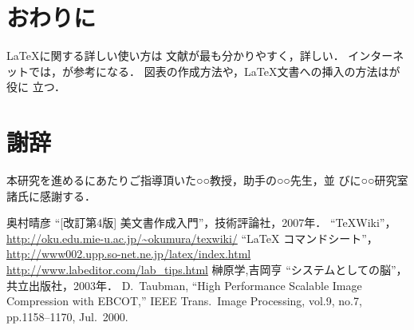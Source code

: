 \documentclass[uplatex,a4paper,9pt]{bxjsarticle}
\begin{document}
\section{おわりに}
\LaTeX に関する詳しい使い方は
文献\cite{okumura}が最も分かりやすく，詳しい．
インターネットでは，\cite{TeXWiki,latexComSheet}が参考になる．
図表の作成方法や，\LaTeX 文書への挿入の方法は\cite{labEditorTips}が役に
立つ．
\section*{謝辞}
本研究を進めるにあたりご指導頂いた○○教授，助手の○○先生，並
びに○○研究室諸氏に感謝する．
\footnotesize
\begin{thebibliography}{9}
 奥村晴彦 ``[改訂第4版] \LaTeXe 美文書作成入門''，技術評論社，2007年．
 ``\TeX Wiki''，\url{http://oku.edu.mie-u.ac.jp/~okumura/texwiki/}
 ``LaTeX コマンドシート''， \url{http://www002.upp.so-net.ne.jp/latex/index.html}
 \url{http://www.labeditor.com/lab_tips.html}
 榊原学,吉岡亨 ``システムとしての脳''，共立出版社，2003年．
 D.\ Taubman, ``High Performance Scalable Image Compression with EBCOT,'' IEEE Trans.\ Image Processing, vol.9, no.7, pp.1158--1170, Jul.\ 2000.
\end{thebibliography}
\end{document}
